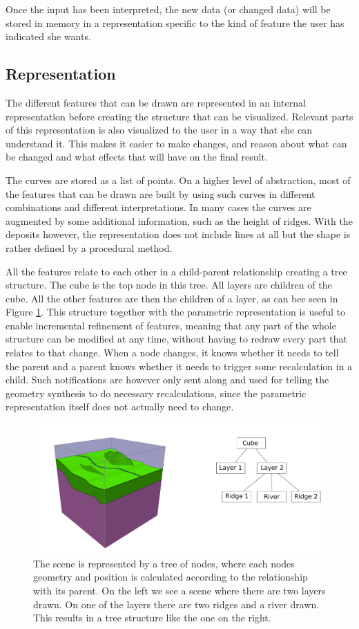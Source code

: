 \documentclass[a4paper,12pt]{report}
\begin{document}
Once the input has been interpreted, the new data (or changed data) will be stored in memory in a representation specific to the kind of feature the user has indicated she wants.

\subsection{Representation}
The different features that can be drawn are represented in an internal representation before creating the structure that can be visualized. Relevant parts of this representation is also visualized to the user in a way that she can understand it. This makes it easier to make changes, and reason about what can be changed and what effects that will have on the final result.


The curves are stored as a list of points. On a higher level of abstraction, most of the features that can be drawn are built by using such curves in different combinations and different interpretations. In many cases the curves are augmented by some additional information, such as the height of ridges. With the deposits however, the representation does not include lines at all but the shape is rather defined by a procedural method.

All the features relate to each other in a child-parent relationship creating a tree structure. The cube is the top node in this tree. All layers are children of the cube. All the other features are then the children of a layer, as can bee seen in Figure \ref{fig:tree}. This structure together with the parametric representation is useful to enable incremental refinement of features, meaning that any part of the whole structure can be modified at any time, without having to redraw every part that relates to that change. When a node changes, it knows whether it needs to tell the parent and a parent knows whether it needs to trigger some recalculation in a child. Such notifications are however only sent along and used for telling the geometry synthesis to do necessary recalculations, since the parametric representation itself does not actually need to change.

\begin{figure}
 \includegraphics[width=\linewidth]{thesis/tree.pdf}
 \caption{The scene is represented by a tree of nodes, where each nodes geometry and position is calculated according to the relationship with its parent. On the left we see a scene where there are two layers drawn. On one of the layers there are two ridges and a river drawn. This results in a tree structure like the one on the right.}
 \label{fig:tree}
\end{figure}
\end{document}
